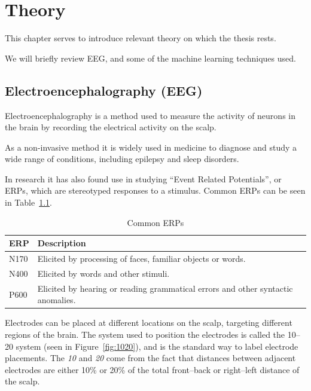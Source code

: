 \chapter{Theory}

This chapter serves to introduce relevant theory on which the thesis rests. 

We will briefly review EEG, and some of the machine learning techniques used.

\section{Electroencephalography (EEG)}\label{eeg-theory}

    Electroencephalography is a method used to measure the activity of neurons in the brain by recording the electrical activity on the scalp.

    As a non-invasive method it is widely used in medicine to diagnose and study a wide range of conditions, including epilepsy and sleep disorders.

    In research it has also found use in studying ``Event Related Potentials'', or ERPs, which are stereotyped responses to a stimulus. Common ERPs can be seen in Table~\ref{table:erps}.


    \begin{table}
        \begin{tabular}{ll}
            \toprule
            ERP & Description
            \\
            \midrule
            N170 & Elicited by processing of faces, familiar objects or words.
            \\
            N400 & Elicited by words and other stimuli.
            \\
            P600 & Elicited by hearing or reading grammatical errors and other syntactic anomalies.
            \\
            \bottomrule
        \end{tabular}
        \caption{Common ERPs}\label{table:erps}
    \end{table}

    Electrodes can be placed at different locations on the scalp, targeting different regions of the brain. The system used to position the electrodes is called the 10–20 system (seen in Figure~\ref{fig:1020}), and is the standard way to label electrode placements. The \emph{10} and \emph{20} come from the fact that distances between adjacent electrodes are either 10\% or 20\% of the total front–back or right–left distance of the scalp.

